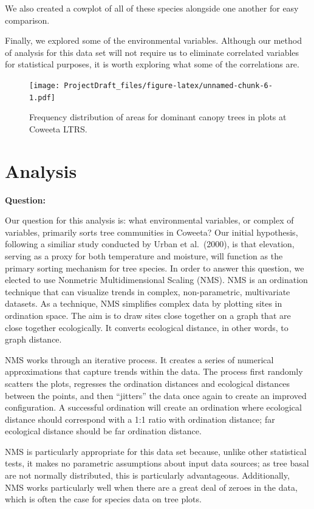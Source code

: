 \documentclass[
  12pt,
]{article}
\begin{document}
We also created a cowplot of all of these species alongside one another
for easy comparison.

Finally, we explored some of the environmental variables. Although our
method of analysis for this data set will not require us to eliminate
correlated variables for statistical purposes, it is worth exploring
what some of the correlations are.

\begin{figure}
\centering
\texttt{[image: ProjectDraft\_files/figure-latex/unnamed-chunk-6-1.pdf]}
\caption{Frequency distribution of areas for dominant canopy trees in
plots at Coweeta LTRS.}
\end{figure}

\newpage

\hypertarget{analysis}{%
\section{Analysis}\label{analysis}}

\textbf{Question:}

Our question for this analysis is: what environmental variables, or
complex of variables, primarily sorts tree communities in Coweeta? Our
initial hypothesis, following a similiar study conducted by Urban et
al.~(2000), is that elevation, serving as a proxy for both temperature
and moisture, will function as the primary sorting mechanism for tree
species. In order to answer this question, we elected to use Nonmetric
Multidimensional Scaling (NMS). NMS is an ordination technique that can
visualize trends in complex, non-parametric, multivariate datasets. As a
technique, NMS simplifies complex data by plotting sites in ordination
space. The aim is to draw sites close together on a graph that are close
together ecologically. It converts ecological distance, in other words,
to graph distance.

NMS works through an iterative process. It creates a series of numerical
approximations that capture trends within the data. The process first
randomly scatters the plots, regresses the ordination distances and
ecological distances between the points, and then ``jitters'' the data
once again to create an improved configuration. A successful ordination
will create an ordination where ecological distance should correspond
with a 1:1 ratio with ordination distance; far ecological distance
should be far ordination distance.

NMS is particularly appropriate for this data set because, unlike other
statistical tests, it makes no parametric assumptions about input data
sources; as tree basal are not normally distributed, this is
particularly advantageous. Additionally, NMS works particularly well
when there are a great deal of zeroes in the data, which is often the
case for species data on tree plots.
\end{document}
